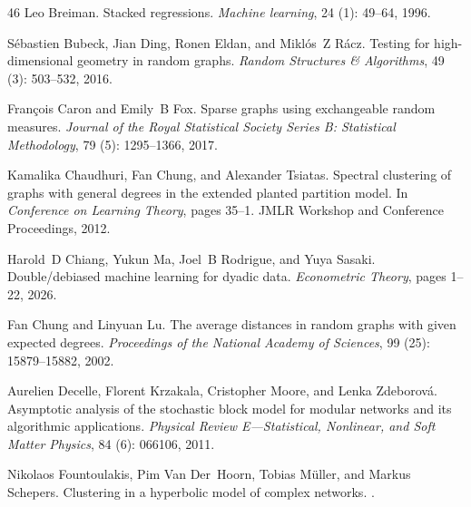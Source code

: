 \documentclass[12pt]{article}
\newcommand{\1}{\mathbf{1}}
\begin{document}
\begin{thebibliography}{46}
Leo Breiman.
\newblock Stacked regressions.
\newblock \emph{Machine learning}, 24 (1): 49--64, 1996.

S{\'e}bastien Bubeck, Jian Ding, Ronen Eldan, and Mikl{\'o}s~Z R{\'a}cz.
\newblock Testing for high-dimensional geometry in random graphs.
\newblock \emph{Random Structures \& Algorithms}, 49 (3):
  503--532, 2016.

Fran{\c{c}}ois Caron and Emily~B Fox.
\newblock Sparse graphs using exchangeable random measures.
\newblock \emph{Journal of the Royal Statistical Society Series B: Statistical
  Methodology}, 79 (5): 1295--1366, 2017.

Kamalika Chaudhuri, Fan Chung, and Alexander Tsiatas.
\newblock Spectral clustering of graphs with general degrees in the extended
  planted partition model.
\newblock In \emph{Conference on Learning Theory}, pages 35--1. JMLR Workshop
  and Conference Proceedings, 2012.

Harold~D Chiang, Yukun Ma, Joel~B Rodrigue, and Yuya Sasaki.
\newblock Double/debiased machine learning for dyadic data.
\newblock \emph{Econometric Theory}, pages 1--22, 2026.

Fan Chung and Linyuan Lu.
\newblock The average distances in random graphs with given expected degrees.
\newblock \emph{Proceedings of the National Academy of Sciences}, 99
  (25): 15879--15882, 2002.

Aurelien Decelle, Florent Krzakala, Cristopher Moore, and Lenka Zdeborov{\'a}.
\newblock Asymptotic analysis of the stochastic block model for modular
  networks and its algorithmic applications.
\newblock \emph{Physical Review E—Statistical, Nonlinear, and Soft Matter
  Physics}, 84 (6): 066106, 2011.

Nikolaos Fountoulakis, Pim Van Der~Hoorn, Tobias M{\"u}ller, and Markus
  Schepers.
\newblock Clustering in a hyperbolic model of complex networks.
.


\end{thebibliography}
\end{document}
